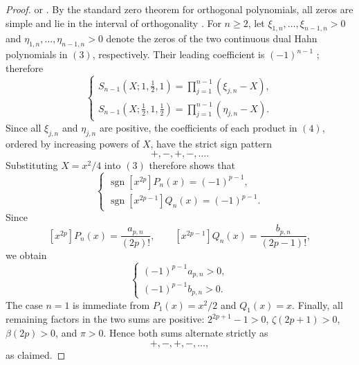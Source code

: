 \documentclass[11pt,twoside]{article}
\numberwithin{equation}{section}
\begin{document}
\begin{proof}
\cite[Table~18.25.1 and Eqs.~(18.25.6)--(18.25.8)]{NIST:DLMF} or
\cite[\S9.3]{KoekoekLeskySwarttouw2010}. By the standard zero theorem for orthogonal
polynomials, all zeros are simple and lie in the interval of orthogonality
\cite[\S18.2(vi)]{NIST:DLMF}. For \(n\geq2\), let \(\xi_{1,n},\ldots,\xi_{n-1,n}>0\) and
\(\eta_{1,n},\ldots,\eta_{n-1,n}>0\) denote the zeros of the two continuous dual Hahn
polynomials in \((3)\), respectively. Their leading coefficient is \((-1)^{n-1}\)
\cite[Table~18.25.2]{NIST:DLMF}; therefore
\[
\begin{cases} \displaystyle S_{n-1}\!\left(X;1,\frac12,1\right) = \prod_{j=1}^{n-1}(\xi_{j,n}-X), \\[3mm] \displaystyle S_{n-1}\!\left(X;\frac12,1,\frac12\right) = \prod_{j=1}^{n-1}(\eta_{j,n}-X).
\end{cases}
\tag{4}
\]
Since all \(\xi_{j,n}\) and \(\eta_{j,n}\) are positive, the coefficients of each product in
\((4)\), ordered by increasing powers of \(X\), have the strict sign pattern
\[
+,-,+,-,\ldots.
\]
Substituting \(X=x^2/4\) into \((3)\) therefore shows that
\[
\begin{cases} \displaystyle \operatorname{sgn}[x^{2p}]P_n(x)=(-1)^{p-1},\\[2mm] \displaystyle \operatorname{sgn}[x^{2p-1}]Q_n(x)=(-1)^{p-1}. \end{cases}
\]
Since
\[
[x^{2p}]P_n(x)=\frac{a_{p,n}}{(2p)!}, \qquad [x^{2p-1}]Q_n(x)=\frac{b_{p,n}}{(2p-1)!},
\]
we obtain
\[
\begin{cases} (-1)^{p-1}a_{p,n}>0,\\[1mm] (-1)^{p-1}b_{p,n}>0. \end{cases}
\]
The case \(n=1\) is immediate from \(P_1(x)=x^2/2\) and \(Q_1(x)=x\). Finally, all remaining
factors in the two sums are positive: \(2^{2p+1}-1>0\), \(\zeta(2p+1)>0\), \(\beta(2p)>0\),
and \(\pi>0\). Hence both sums alternate strictly as
\[
+,-,+,-,\ldots,
\]
as claimed.
\end{proof}
\end{document}
